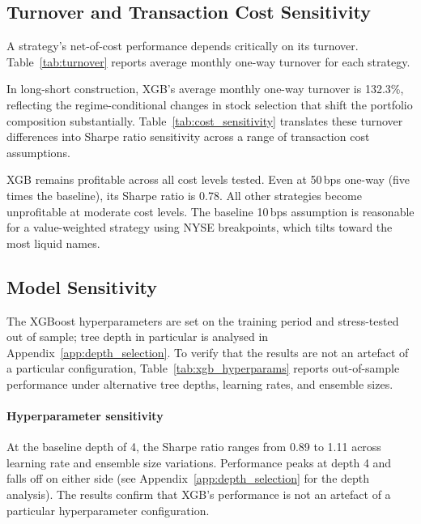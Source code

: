 \subsection{Turnover and Transaction Cost Sensitivity}\label{app:turnover}

A strategy's net-of-cost performance depends critically on its turnover. Table~\ref{tab:turnover} reports average monthly one-way turnover for each strategy.



In long-short construction, XGB's average monthly one-way turnover is 132.3\%, reflecting the regime-conditional changes in stock selection that shift the portfolio composition substantially. Table~\ref{tab:cost_sensitivity} translates these turnover differences into Sharpe ratio sensitivity across a range of transaction cost assumptions.



XGB remains profitable across all cost levels tested. Even at 50\,bps one-way (five times the baseline), its Sharpe ratio is 0.78. All other strategies become unprofitable at moderate cost levels. The baseline 10\,bps assumption is reasonable for a value-weighted strategy using NYSE breakpoints, which tilts toward the most liquid names.

\subsection{Model Sensitivity}\label{app:xgb_sensitivity}

The XGBoost hyperparameters are set on the training period and stress-tested out of sample; tree depth in particular is analysed in Appendix~\ref{app:depth_selection}. To verify that the results are not an artefact of a particular configuration, Table~\ref{tab:xgb_hyperparams} reports out-of-sample performance under alternative tree depths, learning rates, and ensemble sizes.



\paragraph{Hyperparameter sensitivity}
At the baseline depth of 4, the Sharpe ratio ranges from 0.89 to 1.11 across learning rate and ensemble size variations. Performance peaks at depth 4 and falls off on either side (see Appendix~\ref{app:depth_selection} for the depth analysis). The results confirm that XGB's performance is not an artefact of a particular hyperparameter configuration.

